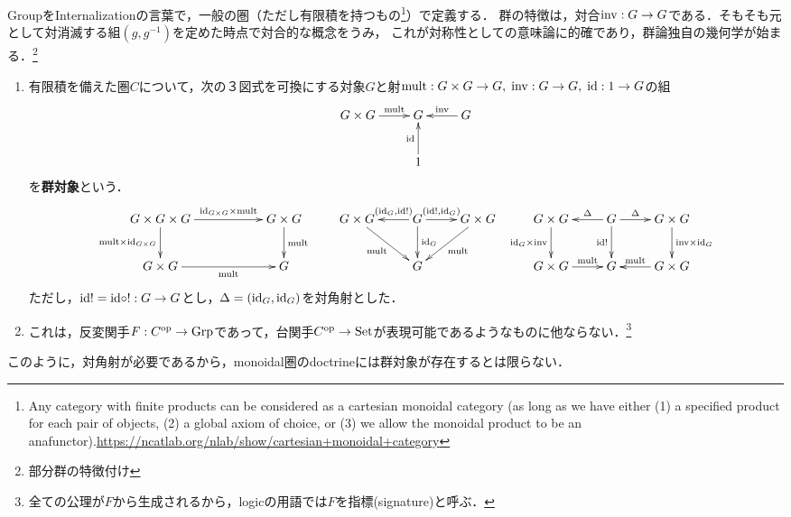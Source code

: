 \documentclass[uplatex,dvipdfmx]{jsreport}
\begin{document}
\begin{tcolorbox}[colframe=ForestGreen, colback=ForestGreen!10!white, breakable ,colbacktitle=ForestGreen!40!white, coltitle=black,fonttitle=\bfseries\sffamily,
    title=]
    GroupをInternalizationの言葉で，一般の圏（ただし有限積を持つもの\footnote{Any category with finite products can be considered as a cartesian monoidal category (as long as we have either (1) a specified product for each pair of objects, (2) a global axiom of choice, or (3) we allow the monoidal product to be an anafunctor).\url{https://ncatlab.org/nlab/show/cartesian+monoidal+category}}）で定義する．
    群の特徴は，対合$\mathrm{inv}:G\to G$である．そもそも元として対消滅する組$(g,g^{-1})$を定めた時点で対合的な概念をうみ，
    これが対称性としての意味論に的確であり，群論独自の幾何学が始まる．\footnote{部分群の特徴付け}
\end{tcolorbox}

\begin{definition}\mbox{}
    \begin{enumerate}
        \item 有限積を備えた圏$C$について，次の３図式を可換にする対象$G$と射$\mathrm{mult}:G\times G\to G,\;\mathrm{inv}:G\to G,\;\mathrm{id}:1\to G$の組
        \[\xymatrix{
            G\times G\ar[r]^-{\mult}&G&G\ar[l]_-{\inv}\\&1\ar[u]^-{\id}
        }\]
        を\textbf{群対象}という．
        \[\xymatrix{
            G\times G\times G\ar[rr]^-{{\scriptsize\id_{G\times G}\times\mult}}\ar[d]_-{\mult\times\id_{G\times G}}&&G\times G\ar[d]^-{\mult}&G\times G\ar[dr]_-{\mult}&G\ar[l]_-{(\id_G,\id!)}\ar[d]^-{\id_G}\ar[r]^-{(\id!,\id_G)}&G\times G\ar[dl]^-{\mult}&G\times G\ar[d]_-{\id_G\times\inv}&G\ar[l]_-{\Delta}\ar[r]^-{\Delta}\ar[d]_-{\id!}&G\times G\ar[d]^-{\inv\times\id_G}\\
            G\times G\ar[rr]_-{\mult}&&G&&G&&G\times G\ar[r]^-{\mult}&G&G\times G\ar[l]_-{\mult}
        }\]
        ただし，$\mathrm{id}!=\mathrm{id}\circ !:G\to G$とし，$\Delta=(\mathrm{id}_G,\mathrm{id}_G)$を対角射とした．
        \item これは，反変関手$F:C^{\mathrm{op}}\to\mathrm{Grp}$であって，台関手$C^{\mathrm{op}}\to\mathrm{Set}$が表現可能であるようなものに他ならない．\footnote{全ての公理が$F$から生成されるから，logicの用語では$F$を指標(signature)と呼ぶ．}
    \end{enumerate}
\end{definition}
\begin{remark}
    このように，対角射が必要であるから，monoidal圏のdoctrineには群対象が存在するとは限らない．
\end{remark}
\end{document}
